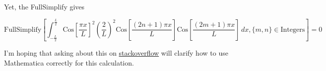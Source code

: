 Yet, the FullSimplify gives

\begin{equation}\label{eqn:qmTwoPs4:450}
\text{FullSimplify}\left[\int_{-\frac{L}{2}}^{\frac{L}{2}} \text{Cos}\left[\frac{\pi  x}{L}\right]^2 \left(\frac{2}{L}\right)^2 \text{Cos}\left[\frac{(2 n+1) \pi  x}{L}\right] \text{Cos}\left[\frac{(2 m+1) \pi  x}{L}\right] \, dx,\{m,n\}\in \text{Integers}\right] = 0
\end{equation}

I'm hoping that asking about this on \href{http://stackoverflow.com/questions/7743774/proper-way-to-simplify-integral-result-in-mathematica-given-integer-constraints}{stackoverflow} will clarify how to use Mathematica correctly for this calculation.

\EndNoBibArticle
